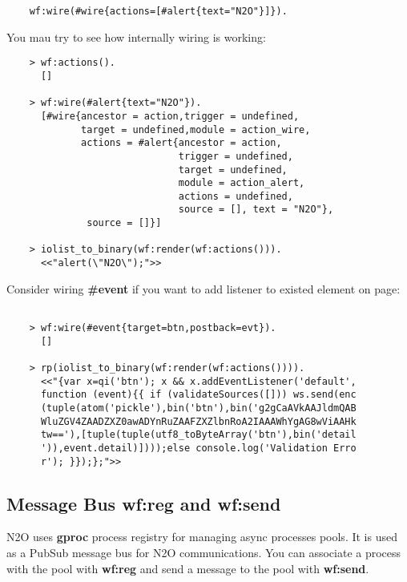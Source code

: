 \vspace{1\baselineskip}
\begin{lstlisting}
    wf:wire(#wire{actions=[#alert{text="N2O"}]}).
\end{lstlisting}
\vspace{1\baselineskip}

You mau try to see how internally wiring is working:

\begin{lstlisting}
    > wf:actions().
      []

    > wf:wire(#alert{text="N2O"}).
      [#wire{ancestor = action,trigger = undefined,
             target = undefined,module = action_wire,
             actions = #alert{ancestor = action,
                              trigger = undefined,
                              target = undefined,
                              module = action_alert,
                              actions = undefined,
                              source = [], text = "N2O"},
              source = []}]

    > iolist_to_binary(wf:render(wf:actions())).
      <<"alert(\"N2O\");">>
\end{lstlisting}

Consider wiring {\bf \#event} if you want to add listener to
existed element on page:

\vspace{1\baselineskip}
\begin{lstlisting}

    > wf:wire(#event{target=btn,postback=evt}).
      []

    > rp(iolist_to_binary(wf:render(wf:actions()))).
      <<"{var x=qi('btn'); x && x.addEventListener('default',
      function (event){{ if (validateSources([])) ws.send(enc
      (tuple(atom('pickle'),bin('btn'),bin('g2gCaAVkAAJldmQAB
      WluZGV4ZAADZXZ0awADYnRuZAAFZXZlbnRoA2IAAAWhYgAG8wViAAHk
      tw=='),[tuple(tuple(utf8_toByteArray('btn'),bin('detail
      ')),event.detail)])));else console.log('Validation Erro
      r'); }});};">>
\end{lstlisting}


\newpage
\subsection{Message Bus {\bf wf:reg} and {\bf wf:send}}
N2O uses {\bf gproc} process registry for managing async processes pools.
It is used as a PubSub message bus for N2O communications.
You can associate a process with the pool with {\bf wf:reg}
and send a message to the pool with {\bf wf:send}.

